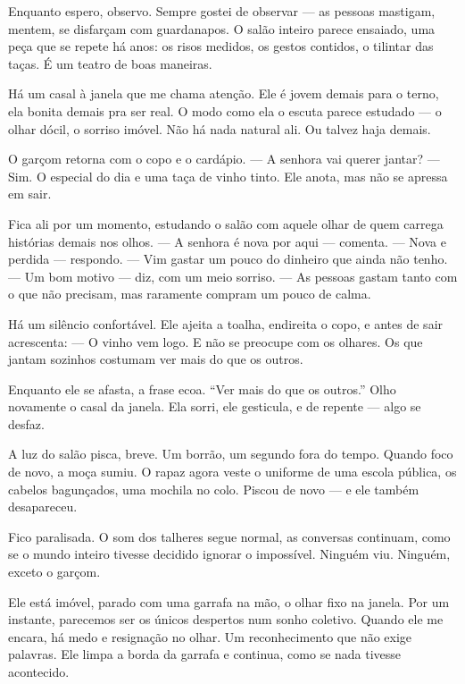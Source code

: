 \medskip

Enquanto espero, observo.  
Sempre gostei de observar — as pessoas mastigam, mentem, se disfarçam com guardanapos.  
O salão inteiro parece ensaiado, uma peça que se repete há anos: os risos medidos, os gestos contidos, o tilintar das taças.  
É um teatro de boas maneiras.  

Há um casal à janela que me chama atenção.  
Ele é jovem demais para o terno, ela bonita demais pra ser real.  
O modo como ela o escuta parece estudado — o olhar dócil, o sorriso imóvel.  
Não há nada natural ali.  
Ou talvez haja demais.

\medskip

O garçom retorna com o copo e o cardápio.  
— A senhora vai querer jantar?  
— Sim. O especial do dia e uma taça de vinho tinto.
Ele anota, mas não se apressa em sair.  

Fica ali por um momento, estudando o salão com aquele olhar de quem carrega histórias demais nos olhos.  
— A senhora é nova por aqui — comenta.
— Nova e perdida — respondo. — Vim gastar um pouco do dinheiro que ainda não tenho.
— Um bom motivo — diz, com um meio sorriso. — As pessoas gastam tanto com o que não precisam, mas raramente compram um pouco de calma.

Há um silêncio confortável.  
Ele ajeita a toalha, endireita o copo, e antes de sair acrescenta:  
— O vinho vem logo. E não se preocupe com os olhares. Os que jantam sozinhos costumam ver mais do que os outros.

\medskip

Enquanto ele se afasta, a frase ecoa.  
“Ver mais do que os outros.”  
Olho novamente o casal da janela.  
Ela sorri, ele gesticula, e de repente — algo se desfaz.

A luz do salão pisca, breve.  
Um borrão, um segundo fora do tempo.  
Quando foco de novo, a moça sumiu.  
O rapaz agora veste o uniforme de uma escola pública, os cabelos bagunçados, uma mochila no colo.  
Piscou de novo — e ele também desapareceu.

\medskip

Fico paralisada.  
O som dos talheres segue normal, as conversas continuam, como se o mundo inteiro tivesse decidido ignorar o impossível.  
Ninguém viu.  
Ninguém, exceto o garçom.

Ele está imóvel, parado com uma garrafa na mão, o olhar fixo na janela.  
Por um instante, parecemos ser os únicos despertos num sonho coletivo.  
Quando ele me encara, há medo e resignação no olhar.  
Um reconhecimento que não exige palavras.  
Ele limpa a borda da garrafa e continua, como se nada tivesse acontecido.

